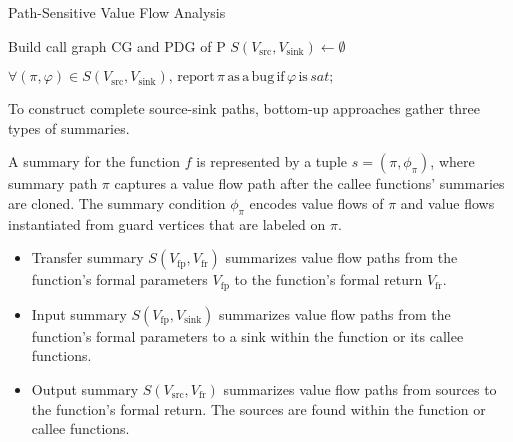 \begin{algorithm}[t]\small
  \caption{Path-Sensitive Value Flow Analysis}
  \label{alg:ps-vf-analysis}
   {
    Build call graph CG and PDG of {P}\;
      $S(V_{\text{src}}, V_{\text{sink}}) \leftarrow \emptyset$\;

     {
    }
    $ \forall (\pi, \varphi) \in S(V_{\text{src}}, V_{\text{sink}}),\, \text{report}\, \pi\, \text{as}\, \text{a}\, \text{bug}\, \text{if}\, \varphi\, \text{is}\, \textit{sat;} $
  }
\end{algorithm}

To construct complete source-sink paths, bottom-up approaches gather three types of summaries.
\begin{definition}
A summary for the function $f$ is represented by a tuple $s = (\pi, \phi_{\pi})$, 
where summary path $\pi$ captures a value flow path after the callee functions' summaries are cloned.
The summary condition $\phi_{\pi}$ encodes value flows of $\pi$ and value flows instantiated from guard vertices that are labeled on $\pi$.
\begin{itemize}
    \item Transfer summary $S(V_{\text{fp}}, V_{\text{fr}})$ summarizes value flow paths from the function's formal parameters $V_{\text{fp}}$ to the function's formal return $V_{\text{fr}}$. 
    \item Input summary $S(V_{\text{fp}}, V_{\text{sink}})$ summarizes value flow paths from the function's formal parameters to a sink within the function or its callee functions.
    \item Output summary $S(V_{\text{src}}, V_{\text{fr}})$ summarizes value flow paths from sources to the function's formal return. The sources are found within the function or callee functions.
\end{itemize}
\end{definition}

